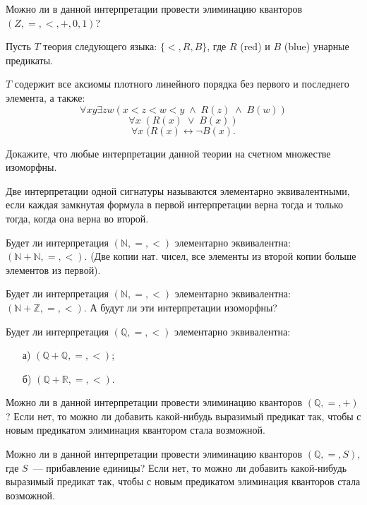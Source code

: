 
\begin{task}
    Можно ли в данной интерпретации провести элиминацию кванторов $(Z, =, <, +, 0, 1)$?
\end{task}

\begin{task}
    Пусть $T$ теория следующего языка: $\{<, R, B\}$, где $R$ (red) и $B$ (blue)
    унарные предикаты.
    
	$T$ содержит все аксиомы плотного линейного порядка без первого и последнего элемента, а также:
	\[ \forall xy \exists zw (x < z < w < y \; \wedge \; R(z) \; \wedge \; B(w)) \]
	\[ \forall x \; (R(x)\; \vee \; B(x)) \]
	\[ \forall x \; (R(x) \leftrightarrow \neg B(x). \]
    
	Докажите, что любые интерпретации данной теории на счетном множестве изоморфны.
\end{task}


Две интерпретации одной сигнатуры называются элементарно
эквивалентными, если каждая замкнутая формула в первой интерпретации
верна тогда и только тогда, когда она верна во второй.

\begin{task}
    Будет ли интерпретация $(\mathbb{N}, =, <)$ элементарно эквивалентна: $(\mathbb{N} + \mathbb{N}, =, <)$. (Две копии
    нат. чисел, все элементы из второй копии больше элементов из первой).
\end{task}

\begin{task}
    Будет ли интерпретация $(\mathbb{N}, =, <)$ элементарно эквивалентна: $(\mathbb{N} + \mathbb{Z}, =, <)$. А будут ли эти
    интерпретации изоморфны?
\end{task}

\begin{task}
    Будет ли интерпретация $(\mathbb{Q}, =, <)$ элементарно эквивалентна:
    \begin{enumerate}[topsep = 0pt, itemsep = -1ex]
        \item [а)] $(\mathbb{Q} + \mathbb{Q}, =, <)$;
        \item [б)] $(\mathbb{Q} + \mathbb{R}, =, <)$.
    \end{enumerate}
\end{task}



\breakline


\begin{ptask}{46}
    Можно ли в данной интерпретации провести элиминацию кванторов $(\mathbb{Q}, =, +)$? Если нет, то можно ли добавить
    какой-нибудь выразимый предикат так, чтобы с новым предикатом элиминация квантором стала возможной.
\end{ptask}

\begin{ptask}{47}
    Можно ли в данной интерпретации провести элиминацию кванторов $(\mathbb{Q}, =, S)$, где $S$~--- прибавление единицы? Если нет,
    то можно ли добавить какой-нибудь выразимый предикат так, чтобы с новым предикатом элиминация кванторов стала возможной.
\end{ptask}
